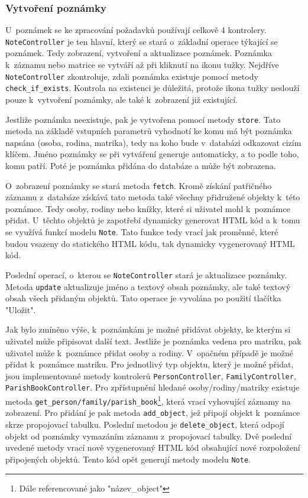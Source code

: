 \subsubsection{Vytvoření poznámky}
U~poznámek se ke zpracování požadavků používají celkově 4 kontrolery. \verb|NoteController| je ten hlavní, který se stará o~základní operace týkající se poznámek. Tedy zobrazení, vytvoření a aktualizace poznámek. Poznámka k~záznamu nebo matrice se vytváří až při kliknutí na ikonu tužky. Nejdříve \verb|NoteController| zkontroluje, zdali poznámka existuje pomocí metody \verb|check_if_exists|. Kontrola na existenci je důležitá, protože ikona tužky neslouží
pouze k~vytvoření poznámky, ale také k~zobrazení již existující.

Jestliže poznámka neexistuje, pak je vytvořena pomocí metody \verb|store|. Tato metoda na základě vstupních parametrů vyhodnotí ke komu má být poznámka napsána (osoba, rodina, matrika), tedy na koho bude v~databázi odkazovat cizím klíčem. Jméno poznámky se při vytváření generuje automaticky, a to podle toho, komu patří. Poté je poznámka přidána do databáze a může být zobrazena.

O~zobrazení poznámky se stará metoda \verb|fetch|. Kromě získání patřičného záznamu z~databáze získává tato metoda také všechny přidružené objekty k~této poznámce. Tedy osoby, rodiny nebo knížky, které si uživatel mohl k~poznámce přidat. U~těchto objektů je zapotřebí dynamicky generovat HTML kód a k~tomu se využívá funkcí modelu \verb|Note|. Tato funkce tedy vrací jak proměnné, které budou vsazeny do statického HTML kódu, tak dynamicky vygenerovaný HTML kód.

Poslední operací, o~kterou se \verb|NoteController| stará je aktualizace poznámky. Metoda \verb|update| aktualizuje jméno a textový obsah poznámky, ale také textový obsah všech přidaným objektů. Tato operace je vyvolána po použití tlačítka "Uložit".

Jak bylo zmíněno výše, k~poznámkám je možné přidávat objekty, ke kterým si uživatel může připisovat další text. Jestliže je poznámka vedena pro matriku, pak uživatel může k~poznámce přidat osoby a rodiny. V~opačném případě je možné přidat k~poznámce matriku. Pro jednotlivý typ objektu, který je možné přidat, jsou implementované metody kontrolerů \verb|PersonController|, \verb|FamilyController|, \verb|ParishBookController|. Pro zpřístupnění hledané osoby/rodiny/matriky existuje metoda \verb|get_person/family/parish_book|\footnote{Dále referencované jako "název\_object"}, která vrací vyhovující záznamy na zobrazení. Pro přidání je pak metoda \verb|add_object|, jež připojí objekt k~poznámce skrze propojovací tabulku. Poslední metodou je \verb|delete_object|, která odpojí objekt od poznámky vymazáním záznamu z~propojovací tabulky. Dvě poslední uvedené metody vrací nově vygenerovaný HTML kód obsahující nové rozpoložení připojených objektů. Tento kód opět generují metody modelu \verb|Note|.

